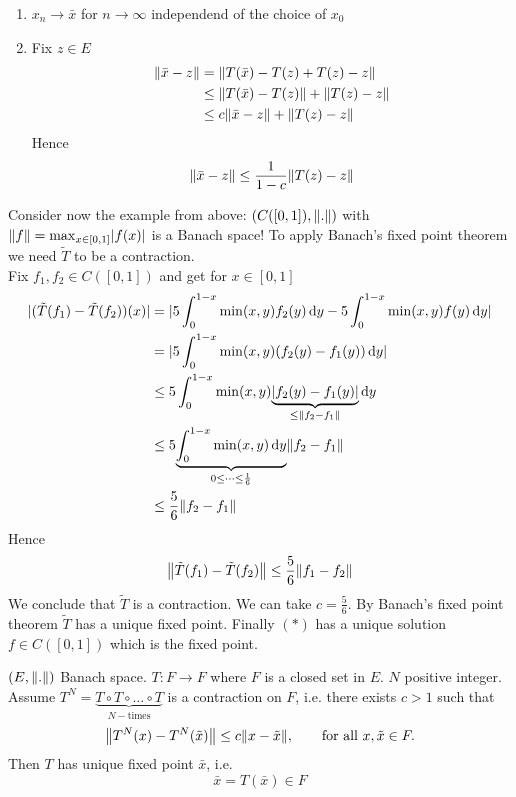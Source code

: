\begin{bemerkung}
	\begin{enumerate}[(1)]
		\item $x_n \to \bar{x}$ for $n \to \infty$ independend of the choice of $x_0$
		\item Fix $z \in E$
		\begin{align*}
			\norm{\bar{x}-z} &= \norm{T(\bar{x})- T(z) + T(z) -z} \\
			&\leq \norm{T(\bar{x})-T(z)} + \norm{T(z) -z} \\
			&\leq c \norm{\bar{x}-z} + \norm{T(z) - z} 
		\end{align*}
		Hence 
		\[
			\norm{\bar{x}-z} \leq \frac{1}{1-c}\norm{T(z)-z}
		\]
	\end{enumerate}
\end{bemerkung}
\begin{beispiel}
	Consider now the example from above: $(C([0,1]), \norm{.})$ with $\norm{f} = \max_{x \in [0,1]}\abs{f(x)}$ is a Banach space! To apply Banach's fixed point theorem we need $\tilde T$ to be a contraction. \\
	Fix $f_1,f_2 \in C([0,1])$ and get for $x \in [0,1]$
	\begin{align*}
		\abs{(\tilde T(f_1)- \tilde T(f_2))(x)} & = \abs{5 \int_{0}^{1-x} \min(x,y)f_2(y) \,\mathrm{d}y - 5 \int_{0}^{1-x}\min(x,y)f(y) \,\mathrm{d}y} \\
		&= \abs{5 \int_{0}^{1-x} \min(x,y)(f_2(y)-f_1(y)) \,\mathrm{d}y} \\
		&\leq 5 \int_{0}^{1-x} \min(x,y) \underset{\leq \norm{f_2-f_1}}{\underbrace{\abs{f_2(y)-f_1(y)}}} \,\mathrm{d}y \\
		&\leq 5 \underset{0 \leq  \dots \leq \frac{1}{6}}{\underbrace{\int_{0}^{1-x} \min(x,y)\,\mathrm{d}y}} \norm{f_2-f_1} \\
		&\leq \frac{5}{6} \norm{f_2-f_1} 
	\end{align*}
	Hence \[
		\norm{\tilde T(f_1)- \tilde T(f_2)} \leq \frac{5}{6} \norm{f_1-f_2}
	\]
	We conclude that $\tilde T$ is a contraction. We can take $c = \frac{5}{6}$. By Banach's fixed point theorem $\tilde T$ has a unique fixed point. Finally $(*)$
	has a unique solution $f \in C([0,1])$ which is the fixed point. 
\end{beispiel}
\begin{theorem}
	$(E, \norm{.})$ Banach space. $T: F \to F$ where $F$ is a closed set in $E$. $N$ positive integer. Assume $T^N = \underset{N-\text{times}}{\underbrace{T \circ T \circ \dots \circ T}}$ is a contraction on $F$, i.e. there exists $c > 1$ such that
	\[
		\norm{T^N(x)- T^N(\tilde x)} \leq c \norm{x-\tilde x}, \qquad \text{for all }x, \tilde x \in F.
	\]
	Then $T$ has unique fixed point $\bar{ x}$, i.e.
	\[
		\bar{x} = T(\bar{x}) \in F
	\]
\end{theorem}
